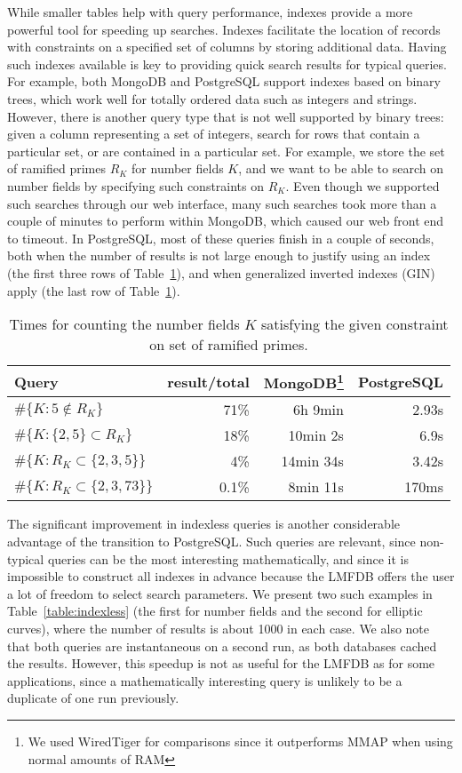 \documentclass{amsart}
\begin{document}
While smaller tables help with query performance, indexes provide a more powerful tool for speeding up searches.
Indexes facilitate the location of records with constraints on a specified set of columns by storing additional data.
Having such indexes available is key to providing quick search results for typical queries.
For example, both MongoDB and PostgreSQL support indexes based on binary trees, which work well for totally ordered data such as integers and strings.
However, there is another query type that is not well supported by binary trees: given a column representing a set of integers, search for rows that contain a particular set, or are contained in a particular set.
For example, we store the set of ramified primes $R_K$ for number fields $K$, and we want to be able to search on number fields by specifying such constraints on $R_K$.
Even though we supported such searches through our web interface, many such searches took more than a couple of minutes to perform within MongoDB, which caused our web front end to timeout.
In PostgreSQL, most of these queries finish in a couple of seconds, both when the number of results is not large enough to justify using an index (the first three rows of Table~\ref{table:ramps}), and when generalized inverted indexes (GIN)~\cite{gin} apply (the last row of Table~\ref{table:ramps}).
\begin{table}[h!]
  \begin{center}
  \begin{tabular}{l|r|r|r}
    Query & result/total & MongoDB\footnote{We used WiredTiger for comparisons since it outperforms MMAP when using normal amounts of RAM} & PostgreSQL\\
\hline
$\#\{K : 5 \notin R_K \}$ & 71\% & 6h 9min & 2.93s \\
$\#\{K : \{2, 5\} \subset R_K\}$ & 18\% &10min 2s & 6.9s\\
$\#\{K: R_K \subset \{2, 3, 5\} \}$ & 4\% & 14min 34s & 3.42s\\
$\#\{K: R_K \subset \{2, 3, 73\} \}$ & 0.1\% & 8min 11s & 170ms
\end{tabular}
\caption{Times for counting the number fields $K$ satisfying the given constraint on set of ramified primes.}
\label{table:ramps}
\end{center}
\end{table}


The significant improvement in indexless queries is another considerable advantage of the transition to PostgreSQL.
Such queries are relevant, since non-typical queries can be the most interesting mathematically, and since it is impossible to construct all indexes in advance because the LMFDB offers the user a lot of freedom to select search parameters.
We present two such examples in Table~\ref{table:indexless} (the first for number fields and the second for elliptic curves), where the number of results is about 1000 in each case.
We also note that both queries are instantaneous on a second run, as both databases cached the results.
However, this speedup is not as useful for the LMFDB as for some applications, since a mathematically interesting query is unlikely to be a duplicate of one run previously.
\end{document}
